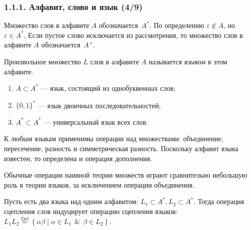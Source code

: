 \documentclass[mathserif,12pt,aspectratio=169]{beamer}
\renewcommand{\index}[1]{}
\def\odmkey#1#2{{\it\color{red} #1}\index{#2}}
\def\Set#1#2{\left\{ #1 \mid #2 \right\}}
\def\Def{\stackrel{\text{Def}}{=}}
\def\And{\operatorname{\,\&\,}}
\begin{document}
\begin{frame}
\frametitle{1.1.1. Алфавит, слово и язык (4/9)}
Множество слов в алфавите
${A}$ обозначается~${A^*}$. 
По определению $\varepsilon \not\in A$, но $\varepsilon\in A^*$.
Если пустое слово исключается из рассмотрения, 
то множество слов в алфавите $A$ 
обозначается~$A^+$.

\smallskip
Произвольное множество $L$ слов в алфавите $A$ называется 
\odmkey{языком}{Язык (language)} в этом алфавите.

\begin{examples}
\begin{enumerate}
\item $A\subset A^*$ --- язык, состоящий из
однобуквенных слов;
\item $\{0,1\}^*$ --- язык двоичных последовательностей;
\item $A^*\subset A^*$ --- универсальный
язык всех слов.
\end{enumerate}
\end{examples}
 
К любым языкам применимы операции над множествами: объединение, пересечение,
разность и симметрическая разность.
Поскольку алфавит языка известен, то определена и
операция дополнения.

\begin{digress}
Обычные операции наивной теории множеств
играют сравнительно небольшую роль в 
теории языков, за исключением
операции объединения.
\end{digress}

\smallskip
Пусть есть два языка над одним алфавитом:
$L_1 \subset A^*, L_2\subset A^*$.  
Тогда операция сцепления слов индуцирует операцию 
сцепления языков: $L_1 L_2 
\Def \Set{\alpha\beta}{\alpha\in L_1 \And
\beta\in L_2}.$
\end{frame}
\end{document}
